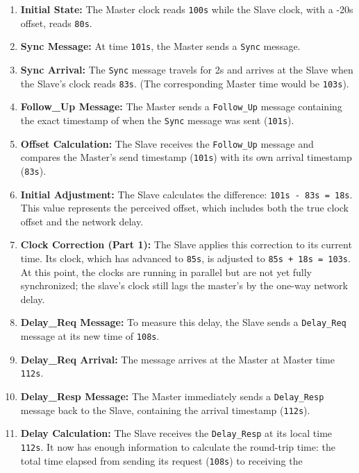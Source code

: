 \documentclass[a4paper, 12pt]{book} %
\begin{document}
\begin{enumerate}
\def\labelenumi{\arabic{enumi}.}
\tightlist
\item
  \textbf{Initial State:} The Master clock reads \texttt{100s} while the
  Slave clock, with a -20s offset, reads \texttt{80s}.
\item
  \textbf{Sync Message:} At time \texttt{101s}, the Master sends a
  \texttt{Sync} message.
\item
  \textbf{Sync Arrival:} The \texttt{Sync} message travels for 2s and
  arrives at the Slave when the Slave's clock reads \texttt{83s}. (The
  corresponding Master time would be \texttt{103s}).
\item
  \textbf{Follow\_Up Message:} The Master sends a \texttt{Follow\_Up}
  message containing the exact timestamp of when the \texttt{Sync}
  message was sent (\texttt{101s}).
\item
  \textbf{Offset Calculation:} The Slave receives the
  \texttt{Follow\_Up} message and compares the Master's send timestamp
  (\texttt{101s}) with its own arrival timestamp (\texttt{83s}).
\item
  \textbf{Initial Adjustment:} The Slave calculates the difference:
  \texttt{101s\ -\ 83s\ =\ 18s}. This value represents the perceived
  offset, which includes both the true clock offset and the network
  delay.
\item
  \textbf{Clock Correction (Part 1):} The Slave applies this correction
  to its current time. Its clock, which has advanced to \texttt{85s}, is
  adjusted to \texttt{85s\ +\ 18s\ =\ 103s}. At this point, the clocks
  are running in parallel but are not yet fully synchronized; the
  slave's clock still lags the master's by the one-way network delay.
\item
  \textbf{Delay\_Req Message:} To measure this delay, the Slave sends a
  \texttt{Delay\_Req} message at its new time of \texttt{108s}.
\item
  \textbf{Delay\_Req Arrival:} The message arrives at the Master at
  Master time \texttt{112s}.
\item
  \textbf{Delay\_Resp Message:} The Master immediately sends a
  \texttt{Delay\_Resp} message back to the Slave, containing the arrival
  timestamp (\texttt{112s}).
\item
  \textbf{Delay Calculation:} The Slave receives the
  \texttt{Delay\_Resp} at its local time \texttt{112s}. It now has
  enough information to calculate the round-trip time: the total time
  elapsed from sending its request (\texttt{108s}) to receiving the

\end{enumerate}
\end{document}
